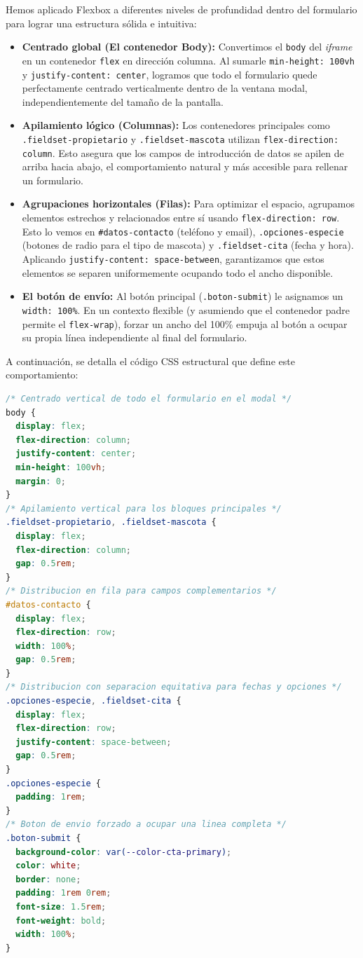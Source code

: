 \documentclass[11pt]{article}
\begin{document}
Hemos aplicado Flexbox a diferentes niveles de profundidad dentro del formulario para lograr una estructura sólida e intuitiva:

\begin{itemize}
    \item \textbf{Centrado global (El contenedor Body):} Convertimos el \texttt{body} del \textit{iframe} en un contenedor \texttt{flex} en dirección columna. Al sumarle \texttt{min-height: 100vh} y \texttt{justify-content: center}, logramos que todo el formulario quede perfectamente centrado verticalmente dentro de la ventana modal, independientemente del tamaño de la pantalla.
    \item \textbf{Apilamiento lógico (Columnas):} Los contenedores principales como \texttt{.fieldset-propietario} y \texttt{.fieldset-mascota} utilizan \texttt{flex-direction: column}. Esto asegura que los campos de introducción de datos se apilen de arriba hacia abajo, el comportamiento natural y más accesible para rellenar un formulario.
    \item \textbf{Agrupaciones horizontales (Filas):} Para optimizar el espacio, agrupamos elementos estrechos y relacionados entre sí usando \texttt{flex-direction: row}. Esto lo vemos en \texttt{\#datos-contacto} (teléfono y email), \texttt{.opciones-especie} (botones de radio para el tipo de mascota) y \texttt{.fieldset-cita} (fecha y hora). Aplicando \texttt{justify-content: space-between}, garantizamos que estos elementos se separen uniformemente ocupando todo el ancho disponible.
    \item \textbf{El botón de envío:} Al botón principal (\texttt{.boton-submit}) le asignamos un \texttt{width: 100\%}. En un contexto flexible (y asumiendo que el contenedor padre permite el \texttt{flex-wrap}), forzar un ancho del 100\% empuja al botón a ocupar su propia línea independiente al final del formulario.
\end{itemize}

A continuación, se detalla el código CSS estructural que define este comportamiento:

\begin{lstlisting}[language=CSS, caption=Uso de CSS Flexbox para la maquetación del formulario de citas]
/* Centrado vertical de todo el formulario en el modal */
body {
  display: flex;
  flex-direction: column;
  justify-content: center;
  min-height: 100vh;
  margin: 0;
}
/* Apilamiento vertical para los bloques principales */
.fieldset-propietario, .fieldset-mascota {
  display: flex;
  flex-direction: column;
  gap: 0.5rem;
}
/* Distribucion en fila para campos complementarios */
#datos-contacto {
  display: flex;
  flex-direction: row;
  width: 100%;
  gap: 0.5rem;
}
/* Distribucion con separacion equitativa para fechas y opciones */
.opciones-especie, .fieldset-cita {
  display: flex;
  flex-direction: row;
  justify-content: space-between;
  gap: 0.5rem;
}
.opciones-especie {
  padding: 1rem;
}
/* Boton de envio forzado a ocupar una linea completa */
.boton-submit {
  background-color: var(--color-cta-primary);
  color: white;
  border: none;
  padding: 1rem 0rem;
  font-size: 1.5rem;
  font-weight: bold;
  width: 100%;
}
\end{lstlisting}
\end{document}
